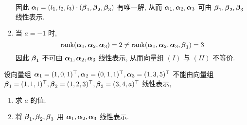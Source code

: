 \begin{solution}
\begin{enumerate}[label=(\arabic{*})]
$$              $$
              因此 $\vb*{\alpha}_i=(l_1, l_2, l_3)\cdot (\vb*{\beta}_1, \vb*{\beta}_2, \vb*{\beta}_3)$ 有唯一解, 从而 $\vb*{\alpha}_1, \vb*{\alpha}_2, \vb*{\alpha}_3$ 可由 $\vb*{\beta}_1, \vb*{\beta}_2, \vb*{\beta}_3$ 线性表示.
        \item 当 $a=-1$ 时, $$\rank(\vb*{\alpha}_1, \vb*{\alpha}_2, \vb*{\alpha}_3)=2\neq \rank(\vb*{\alpha}_1, \vb*{\alpha}_2, \vb*{\alpha}_3,\vb*{\beta}_1)=3$$
              因此 $\vb*{\beta}_1$ 不可由 $\vb*{\alpha}_1, \vb*{\alpha}_2, \vb*{\alpha}_3$ 线性表示, 从而向量组 $(I)$ 与 $(II)$ 不等价.
    \end{enumerate}
\end{solution}

\begin{example}[2011 数一]
    设向量组 $\vb*{\alpha}_1=(1,0,1)^\top,\vb*{\alpha}_2=(0,1,1)^\top,\vb*{\alpha}_3=(1,3,5)^\top$ 不能由向量组 $\vb*{\beta}_1=(1,1,1)^\top,\vb*{\beta}_2=(1,2,3)^\top,\vb*{\beta}_3=(3,4,a)^\top$ 线性表示,
    \begin{enumerate}[label=(\arabic{*})]
        \item 求 $a$ 的值;
        \item 将 $\vb*{\beta}_1, \vb*{\beta}_2, \vb*{\beta}_3$ 用 $\vb*{\alpha}_1, \vb*{\alpha}_2, \vb*{\alpha}_3$ 线性表示.
    \end{enumerate}
\end{example}
